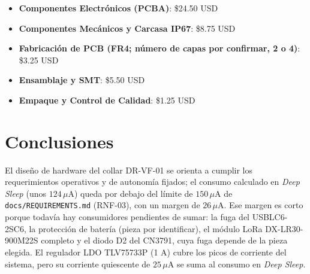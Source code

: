 \begin{itemize}[leftmargin=*]
    \item \textbf{Componentes Electrónicos (PCBA)}: \$24.50 USD
    \item \textbf{Componentes Mecánicos y Carcasa IP67}: \$8.75 USD
    \item \textbf{Fabricación de PCB (FR4; número de capas por confirmar, 2 o 4)}: \$3.25 USD
    \item \textbf{Ensamblaje y SMT}: \$5.50 USD
    \item \textbf{Empaque y Control de Calidad}: \$1.25 USD
\end{itemize}

\section{Conclusiones}

El diseño de hardware del collar DR-VF-01 se orienta a cumplir los requerimientos operativos y de autonomía fijados; el consumo calculado en \emph{Deep Sleep} (unos $124\,\mu\text{A}$) queda por debajo del límite de $150\,\mu\text{A}$ de \texttt{docs/REQUIREMENTS.md} (RNF-03), con un margen de $26\,\mu\text{A}$. Ese margen es corto porque todavía hay consumidores pendientes de sumar: la fuga del USBLC6-2SC6, la protección de batería (pieza por identificar), el módulo LoRa DX-LR30-900M22S completo y el diodo D2 del CN3791, cuya fuga depende de la pieza elegida. El regulador LDO TLV75733P (1 A) cubre los picos de corriente del sistema, pero su corriente quiescente de $25\,\mu\text{A}$ se suma al consumo en \emph{Deep Sleep}.